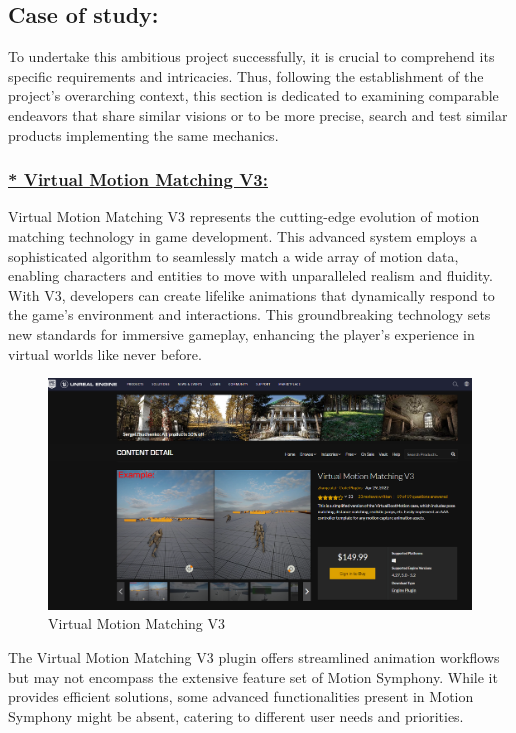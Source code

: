 \documentclass[12pt]{book}
\begin{document}
\subsection{Case of study:}
To undertake this ambitious project successfully, it is crucial to comprehend its specific
requirements and intricacies. Thus, following the establishment of the project's overarching
context, this section is dedicated to examining comparable endeavors that share similar visions or to be more precise, search and test similar products implementing the same mechanics.

\subsubsection{\underline{* Virtual Motion Matching V3:}}
Virtual Motion Matching V3 represents the cutting-edge evolution of motion matching
technology in game development. This advanced system employs a sophisticated algorithm
to seamlessly match a wide array of motion data, enabling characters and entities to move
with unparalleled realism and fluidity. With V3, developers can create lifelike animations
that dynamically respond to the game's environment and interactions. This groundbreaking
technology sets new standards for immersive gameplay, enhancing the player's experience
in virtual worlds like never before.
\begin{figure}[!h]
    \centering
    \includegraphics[scale=0.3]{./Figures/Images/virtual-motion-matching.png}
    \caption{Virtual Motion Matching V3}
    \label{Virtual Motion Matching V3}
\end{figure}
The Virtual Motion Matching V3 plugin offers streamlined animation workflows but may not encompass the extensive feature set of Motion Symphony. While it provides efficient solutions, some advanced functionalities present in Motion Symphony might be absent, catering to different user needs and priorities.
\end{document}
